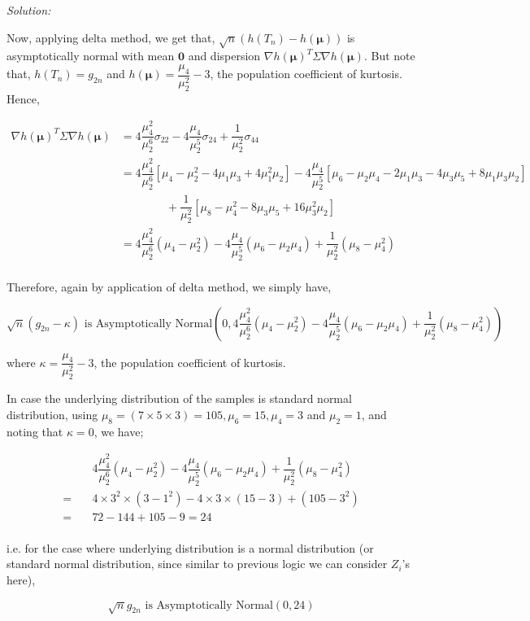 \documentclass[12pt]{article}
\theoremstyle{definition}
\newenvironment{answer}{\textit{Solution: }\quad }{ \hfill \qedsymbol}
\begin{document}
\begin{answer}
\begin{enumerate}
		Now, applying delta method, we get that, $\sqrt{n}(h(T_n) - h(\bm{\mu}))$ is asymptotically normal with mean $\bm{0}$ and dispersion $\nabla h(\bm{\mu})^T \Sigma \nabla h(\bm{\mu})$. But note that, $h(T_n) = g_{2n}$ and $h(\bm{\mu}) = \dfrac{\mu_4}{\mu_2^2} - 3$, the population coefficient of kurtosis. Hence,

		\begin{align*}
			\nabla h(\bm{\mu})^T \Sigma \nabla h(\bm{\mu})
			& = 4 \dfrac{\mu_4^2}{\mu_2^6} \sigma_{22} - 4 \dfrac{\mu_4}{\mu_2^5}\sigma_{24} + \dfrac{1}{\mu_2^2} \sigma_{44}\\
			& = 4 \dfrac{\mu_4^2}{\mu_2^6} \left[ \mu_4 - \mu_2^2 - 4 \mu_1\mu_3 + 4 \mu_1^2 \mu_2 \right] - 4 \dfrac{\mu_4}{\mu_2^5} \left[ \mu_6 - \mu_2\mu_4 - 2\mu_1\mu_3 - 4\mu_3\mu_5 + 8 \mu_1\mu_3\mu_2 \right]\\
			& \qquad \qquad + \dfrac{1}{\mu_2^2} \left[ \mu_8 - \mu_4^2 - 8 \mu_3 \mu_5 + 16 \mu_3^2\mu_2 \right]\\
			& = 4 \dfrac{\mu_4^2}{\mu_2^6} \left( \mu_4 - \mu_2^2 \right) - 4 \dfrac{\mu_4}{\mu_2^5} \left( \mu_6 - \mu_2\mu_4 \right) + \dfrac{1}{\mu_2^2} \left( \mu_8 - \mu_4^2 \right)\\
		\end{align*}

		Therefore, again by application of delta method, we simply have,

		$$\sqrt{n} (g_{2n} - \kappa) \text{ is Asymptotically Normal} \left(0, 4 \dfrac{\mu_4^2}{\mu_2^6} \left( \mu_4 - \mu_2^2 \right) - 4 \dfrac{\mu_4}{\mu_2^5} \left( \mu_6 - \mu_2\mu_4 \right) + \dfrac{1}{\mu_2^2} \left( \mu_8 - \mu_4^2 \right) \right)$$

		where $\kappa = \dfrac{\mu_4}{\mu_2^2} - 3$, the population coefficient of kurtosis.
		
		In case the underlying distribution of the samples is standard normal distribution, using $\mu_8 = (7\times 5 \times 3) = 105, \mu_6 = 15, \mu_4 = 3$ and $\mu_2 = 1$, and noting that $\kappa = 0$, we have;

		\begin{align*}
			& 4 \dfrac{\mu_4^2}{\mu_2^6} \left( \mu_4 - \mu_2^2 \right) - 4 \dfrac{\mu_4}{\mu_2^5} \left( \mu_6 - \mu_2\mu_4 \right) + \dfrac{1}{\mu_2^2} \left( \mu_8 - \mu_4^2 \right)\\
			= \quad & 4 \times 3^2 \times (3 - 1^2) - 4 \times 3 \times (15 - 3) + (105 - 3^2)\\
			= \quad & 72 - 144 + 105 - 9 = 24\\
		\end{align*}

		i.e. for the case where underlying distribution is a normal distribution (or standard normal distribution, since similar to previous logic we can consider $Z_i$'s here),

		$$\sqrt{n} g_{2n} \text{ is Asymptotically Normal} \left(0, 24 \right)$$
	\end{enumerate}

\end{answer}
\end{document}
